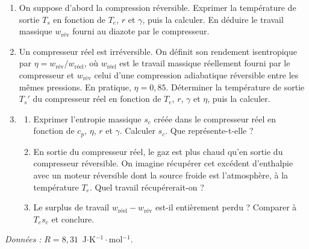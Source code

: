 \begin{enumerate}

	\item On suppose d'abord la compression réversible. Exprimer la température de sortie $T_s$ en fonction de $T_e$, $r$ et $\gamma$, puis la calculer. En déduire le travail massique $w_{\text{rév}}$ fourni au diazote par le compresseur.

	\item Un compresseur réel est irréversible. On définit son rendement isentropique par $\eta=w_{\text{rév}}/w_{\text{réel}}$, où $w_{\text{réel}}$ est le travail massique réellement fourni par le compresseur et $w_{\text{rév}}$ celui d'une compression adiabatique réversible entre les mêmes pressions. En pratique, $\eta=0{,}85$. Déterminer la température de sortie $T_s'$ du compresseur réel en fonction de $T_e$, $r$, $\gamma$ et $\eta$, puis la calculer.

	\item
	\begin{enumerate}
		\item Exprimer l'entropie massique $s_c$ créée dans le compresseur réel en fonction de $c_p$, $\eta$, $r$ et $\gamma$. Calculer $s_c$. Que représente-t-elle ?
		\item En sortie du compresseur réel, le gaz est plus chaud qu'en sortie du compresseur réversible. On imagine récupérer cet excédent d'enthalpie avec un moteur réversible dont la source froide est l'atmosphère, à la température $T_e$. Quel travail récupérerait-on ?
		\item Le surplus de travail $w_{\text{réel}}-w_{\text{rév}}$ est-il entièrement perdu ? Comparer à $T_es_c$ et conclure.
	\end{enumerate}

\end{enumerate}

\textit{Données :} $R=8{,}31$~J$\cdot$K$^{-1}\cdot$mol$^{-1}$.

\newpage


